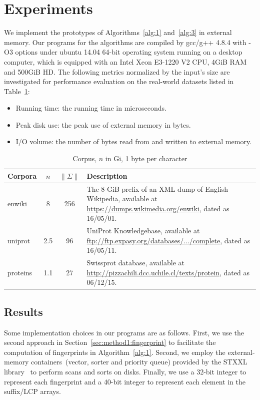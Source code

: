 \documentclass[10pt,journal,compsoc]{IEEEtran}
\begin{document}
\section{Experiments} \label{sec:experiment}
	
	We implement the prototypes of Algorithms~\ref{alg:1} and~\ref{alg:3} in external memory. Our programs for the algorithms are compiled by gcc/g++ 4.8.4 with -O3 options under ubuntu 14.04 64-bit operating system running on a desktop computer, which is equipped with an Intel Xeon E3-1220 V2 CPU, 4GiB RAM and 500GiB HD. The following metrics normalized by the input's size are investigated for performance evaluation on the real-world datasets listed in Table~\ref{tbl:1}:
	
	\begin{itemize}
		
		\item Running time: the running time in microseconds.
		
		\item Peak disk use: the peak use of external memory in bytes.
		
		\item I/O volume: the number of bytes read from and written to external memory.
		
	\end{itemize}
	
	\renewcommand\arraystretch{1.3}
	\begin{table}[!t]
		\caption{Corpus, $n$ in Gi, 1 byte per character}
		\label{tbl:1}
		\centering
		\begin{tabular}{|l|c|c|p{10cm}|}
			\hline
			Corpora & \multicolumn{1}{c|}{$n$} & \multicolumn{1}{c|}{$\|\Sigma\|$} & Description \\\hline
			enwiki & 8 & 256 & The 8-GiB prefix of an XML dump of English Wikipedia, available at \url{https://dumps.wikimedia.org/enwiki}, dated as 16/05/01. \\\hline	
			uniprot & 2.5 & 96 & UniProt Knowledgebase, available at \url{ftp://ftp.expasy.org/databases/.../complete}, dated as 16/05/11. \\\hline
			proteins & 1.1 & 27 & Swissprot database, available at \url{http://pizzachili.dcc.uchile.cl/texts/protein}, dated as 06/12/15. \\\hline
		\end{tabular}
	\end{table}
	
	\subsection{Results}
	Some implementation choices in our programs are as follows. First, we use the second approach in Section~\ref{sec:method1:fingerprint} to facilitate the computation of fingerprints in Algorithm~\ref{alg:1}. Second, we employ the external-memory containers~(vector, sorter and priority queue) provided by the STXXL library~\cite{Dementiev2007} to perform scans and sorts on disks. Finally, we use a 32-bit integer to represent each fingerprint and a 40-bit integer to represent each element in the suffix/LCP arrays.
	
\end{document}
